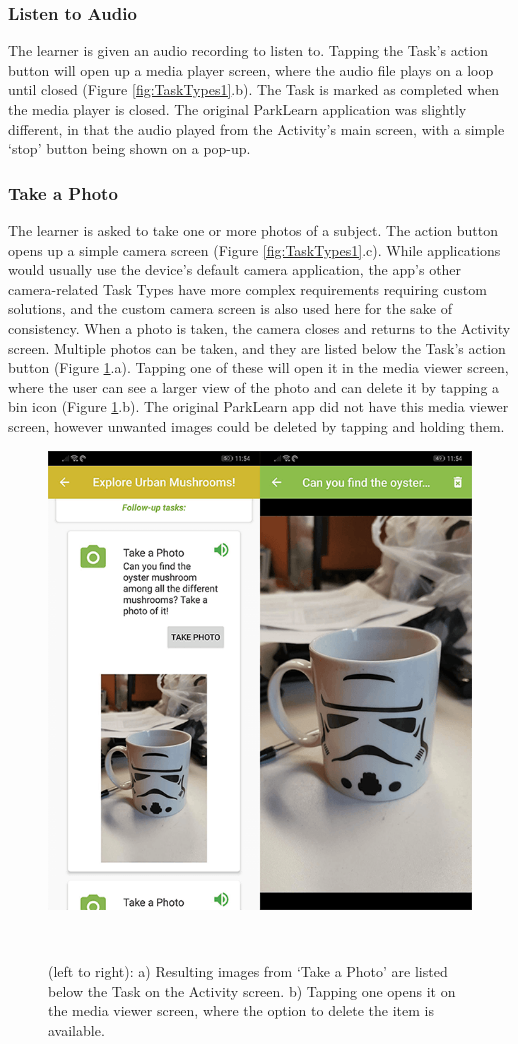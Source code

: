\subsubsection*{Listen to Audio}
The learner is given an audio recording to listen to. Tapping the Task's action button will open up a media player screen, where the audio file plays on a loop until closed (Figure \ref{fig:TaskTypes1}.b). The Task is marked as completed when the media player is closed. The original ParkLearn application was slightly different, in that the audio played from the Activity's main screen, with a simple `stop' button being shown on a pop-up.
    
\subsubsection*{Take a Photo}
The learner is asked to take one or more photos of a subject. The action button opens up a simple camera screen (Figure \ref{fig:TaskTypes1}.c). While applications would usually use the device's default camera application, the app's other camera-related Task Types have more complex requirements requiring custom solutions, and the custom camera screen is also used here for the sake of consistency. When a photo is taken, the camera closes and returns to the Activity screen. Multiple photos can be taken, and they are listed below the Task's action button (Figure \ref{fig:MediaViewer}.a). Tapping one of these will open it in the media viewer screen, where the user can see a larger view of the photo and can delete it by tapping a bin icon (Figure \ref{fig:MediaViewer}.b). The original ParkLearn app did not have this media viewer screen, however unwanted images could be deleted by tapping and holding them.

\begin{figure}
  \centering
  \includegraphics[width=0.55\columnwidth]{images/chapter05/mediaViewer.png}
  \caption[OurPlace's media viewer]{(left to right): a) Resulting images from `Take a Photo' are listed below the Task on the Activity screen. b) Tapping one opens it on the media viewer screen, where the option to delete the item is available.}~\label{fig:MediaViewer}
\end{figure}

